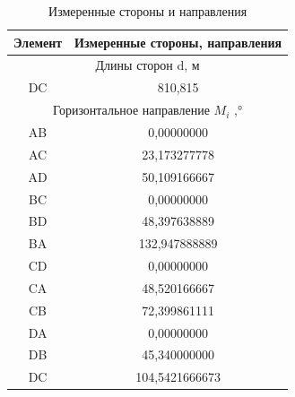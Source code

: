 \documentclass[a4paper]{article}
\begin{document}
\begin{table}[h]
    \centering
    \caption{Измеренные стороны и направления}
    \begin{tabular}{|p{3.5cm}|p{6.0cm}|}
    \hline
    \multicolumn{1}{|c|}{Элемент} & \multicolumn{1}{|c|}{Измеренные стороны, направления}\\
    \hline
    \multicolumn{2}{|c|}{Длины сторон d, м }\\
    \hline
    \multicolumn{1}{|c|}{DC} & \multicolumn{1}{c|}{810,815}\\
    \hline
    \multicolumn{2}{|c|}{Горизонтальное направление $M_i$ ,°}\\
    \hline
    \multicolumn{1}{|c|}{AB} & \multicolumn{1}{c|}{0,00000000}\\
    \hline
    \multicolumn{1}{|c|}{AC} & \multicolumn{1}{c|}{23,173277778}\\
    \hline
    \multicolumn{1}{|c|}{AD} & \multicolumn{1}{c|}{50,109166667}\\
    \hline
    \multicolumn{1}{|c|}{BC} & \multicolumn{1}{c|}{0,00000000}\\
    \hline
    \multicolumn{1}{|c|}{BD} & \multicolumn{1}{c|}{48,397638889}\\
    \hline
    \multicolumn{1}{|c|}{BA} & \multicolumn{1}{c|}{132,947888889}\\
    \hline
    \multicolumn{1}{|c|}{CD} & \multicolumn{1}{c|}{0,00000000}\\
    \hline
    \multicolumn{1}{|c|}{CA} & \multicolumn{1}{c|}{48,520166667}\\
    \hline
    \multicolumn{1}{|c|}{CB} & \multicolumn{1}{c|}{72,399861111}\\
    \hline
    \multicolumn{1}{|c|}{DA} & \multicolumn{1}{c|}{0,00000000}\\
    \hline
    \multicolumn{1}{|c|}{DB} & \multicolumn{1}{c|}{45,340000000}\\
    \hline
    \multicolumn{1}{|c|}{DC} & \multicolumn{1}{c|}{104,5421666673}\\
    \hline
\end{tabular}
\end{table}
\newpage
\par
\end{document}
